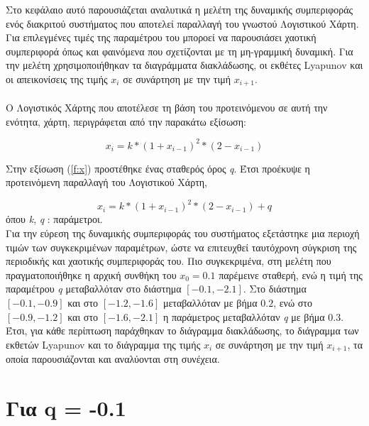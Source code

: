 Στο κεφάλαιο αυτό παρουσιάζεται αναλυτικά η μελέτη της δυναμικής συμπεριφοράς ενός διακριτού συστήματος που αποτελεί παραλλαγή του γνωστού Λογιστικού Χάρτη. Για επιλεγμένες τιμές της παραμέτρου του μποροεί να παρουσιάσει χαοτική συμπεριφορά όπως και φαινόμενα που σχετίζονται με τη μη-γραμμική δυναμική. Για την μελέτη χρησιμοποιήθηκαν τα διαγράμματα διακλάδωσης, οι εκθέτες Lyapunov και οι απεικονίσεις της τιμής \(x_i\) σε συνάρτηση με  την τιμή \(x_{i+1}\).\\\\
Ο Λογιστικός Χάρτης που αποτέλεσε τη βάση του προτεινόμενου σε αυτή την ενότητα, χάρτη, περιγράφεται από την παρακάτω εξίσωση:

\begin{equation}
	x_i=k*(1+x_{i-1})^2 *(2-x_{i-1})
	\label{f:x}
\end{equation}


Στην εξίσωση (\ref{f:x}) προστέθηκε ένας σταθερός όρος \emph{q}. Έτσι προέκυψε η προτεινόμενη παραλλαγή του Λογιστικού Χάρτη,

\begin{equation}
	x_i=k*(1+x_{i-1})^2 *(2-x_{i-1}) +q
	\label{f:x1}
\end{equation}
όπου \emph{k}, \emph{q} : παράμετροι.\\

Για την εύρεση της δυναμικής συμπεριφοράς του συστήματος εξετάστηκε μια περιοχή τιμών των συγκεκριμένων παραμέτρων, ώστε να επιτευχθεί ταυτόχρονη σύγκριση της περιοδικής και χαοτικής συμπεριφοράς του. Πιο συγκεκριμένα, στη μελέτη που πραγματοποιήθηκε η αρχική συνθήκη του $x_0 =0.1$ παρέμεινε  σταθερή, ενώ η τιμή της παραμέτρου \emph{q} μεταβαλλόταν στο διάστημα $[-0.1,-2.1]$. Στο διάστημα  $[-0.1,-0.9]$ και στο $[-1.2,-1.6]$ μεταβαλλόταν με βήμα $0.2$, ενώ στο $[-0.9,-1.2]$ και στο $[-1.6,-2.1]$ η παράμετρος  μεταβαλλόταν \emph{q} με βήμα $0.3$. Έτσι, για κάθε περίπτωση παράχθηκαν το διάγραμμα διακλάδωσης, το διάγραμμα των εκθετών Lyapunov και το διάγραμμα της τιμής \(x_i\) σε συνάρτηση με  την τιμή \(x_{i+1}\), τα οποία παρουσιάζονται και αναλύονται στη συνέχεια.\\


\section{Για q = -0.1 }

